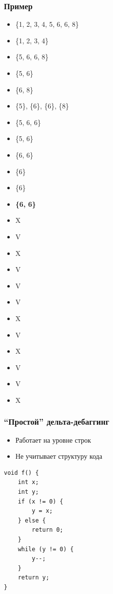 \begin{frame}[fragile]
	\frametitle{Пример}
\begin{minipage}[t]{0.48\linewidth}
		\begin{itemize}
		\item[] \{1, 2, 3, 4, 5, 6, 6, 8\} 
		\item[] \{1, 2, 3, 4\}			  
		\item[] \{5, 6, 6, 8\}
		\item[] \{5, 6\}
		\item[] \{6, 8\}
		\item[] \{5\}, \{6\}, \{6\}, \{8\}
		\item[] \{5, 6, 6\}
		\item[] \{5, 6\}
		\item[] \{6, 6\}
		\item[] \{6\}
		\item[] \{6\}
		\item[] \textbf{\{6, 6\}}
	\end{itemize}
\end{minipage}
\begin{minipage}[t]{0.48\linewidth}
		\begin{itemize}
		\item[] {\color{red}X}
		\item[] {\color{forest}V}	  
		\item[] {\color{red}X}
		\item[] {\color{forest}V}
		\item[] {\color{forest}V}
		\item[] {\color{forest}V}
		\item[] {\color{red}X}
		\item[] {\color{forest}V}
		\item[] {\color{red}X}
		\item[] {\color{forest}V}
		\item[] {\color{forest}V}
		\item[] {\color{red}X}
	\end{itemize}
\end{minipage}

\end{frame}


\begin{frame}[fragile]
	\frametitle{``Простой'' дельта-дебаггинг}
	\begin{itemize}
		\item Работает на уровне строк
		\item Не учитывает структуру кода
	\end{itemize}
	\begin{lstlisting}[style=crs_cpp]
void f() {
    int x;
    int y;
    if (x != 0) {
        y = x;
    } else {
        return 0;
    }
    while (y != 0) {
        y--;
    }
    return y;
}
\end{lstlisting}
\end{frame}

